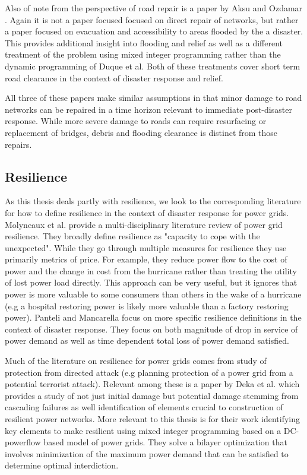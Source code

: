 \documentclass{article}
\begin{document}
		Also of note from the perspective of road repair is a paper by Aksu and Ozdamar \cite{AksuEA2014}. Again it is not a paper focused focused on direct repair of networks, but rather a paper focused on evacuation and accessibility to areas flooded by the a disaster. This provides additional insight into flooding and relief as well as a different treatment of the problem using mixed integer programming rather than the dynamic programming of Duque et al. Both of these treatments cover short term road clearance in the context of disaster response and relief. 
		
		All three of these papers make similar assumptions in that minor damage to road networks can be repaired in a time horizon relevant to immediate post-disaster response. While more severe damage to roads can require resurfacing or replacement of bridges, debris and flooding clearance is distinct from those repairs.
	
	\subsection{Resilience}
		As this thesis deals partly with resilience, we look to the corresponding literature for how to define resilience in the context of disaster response for power grids. Molyneaux et al. \cite{MolyneauxEA2016} provide a multi-disciplinary literature review of power grid resilience. They broadly define resilience as "capacity to cope with the unexpected". While they go through multiple measures for resilience they use primarily metrics of price. For example, they reduce power flow to the cost of power and the change in cost from the hurricane rather than treating the utility of lost power load directly. This approach can be very useful, but it ignores that power is more valuable to some consumers than others in the wake of a hurricane (e.g a hospital restoring power is likely more valuable than a factory restoring power). Panteli and Mancarella \cite{Panteli2017} focus on more specific resilience definitions in the context of disaster response. They focus on both magnitude of drop in service of power demand as well as time dependent total loss of power demand satisfied.
		
		Much of the literature on resilience for power grids comes from study of protection from directed attack (e.g planning protection of a power grid from a potential terrorist attack). Relevant among these is a paper by Deka et al. \cite{Deka2018} which provides a study of not just initial damage but potential damage stemming from cascading failures as well identification of elements crucial to construction of resilient power networks. More relevant to this thesis is \cite{Salmeron2004} for their work identifying key elements to make resilient using mixed integer programming based on a DC-powerflow based model of power grids. They solve a bilayer optimization that involves minimization of the maximum power demand that can be satisfied to determine optimal interdiction.
\end{document}

